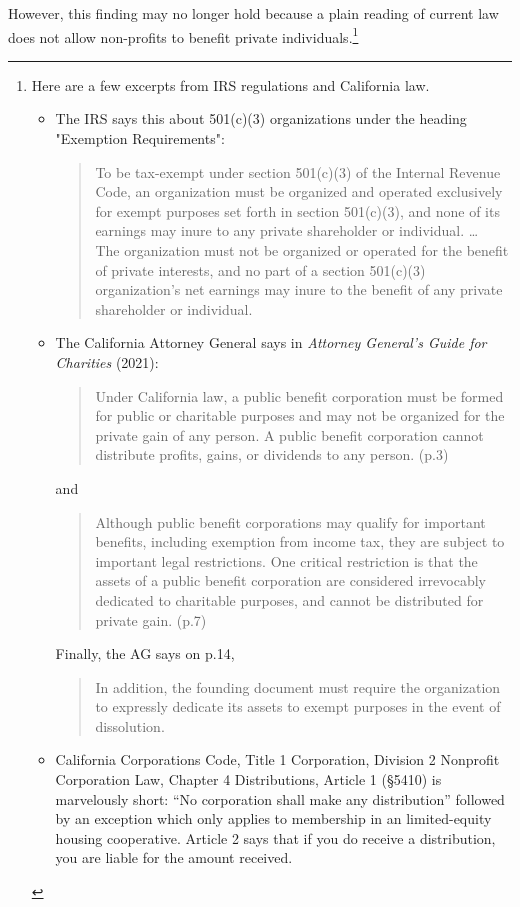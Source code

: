 However, this finding may no longer hold because a plain reading of current law does not allow non-profits to benefit private individuals.\footnote{Here are a few excerpts from IRS regulations and California law.
  
  \begin{itemize}
    \item The IRS says this about 501(c)(3) organizations under the heading "Exemption Requirements":
    \begin{quote}\noindent
      To be tax-exempt under section 501(c)(3) of the Internal Revenue Code, an organization must be organized and operated exclusively for exempt purposes set forth in section 501(c)(3), and none of its earnings may inure to any private shareholder or individual.
      \ldots\\
      The organization must not be organized or operated for the benefit of private interests, and no part of a section 501(c)(3) organization's net earnings may inure to the benefit of any private shareholder or individual.
    \end{quote}
    \item The California Attorney General says in \textit{Attorney General's Guide for Charities} (2021):
    \begin{quote}
      Under California law, a public beneﬁt corporation must be formed for public or charitable purposes and may not be organized for the private gain of any person. A public beneﬁt corporation cannot distribute proﬁts, gains, or dividends to any person. (p.3)
    \end{quote}
    and
    \begin{quote}
      Although public beneﬁt corporations may qualify for important beneﬁts, including exemption from income tax, they are subject to important legal restrictions. One critical restriction is that the assets of a public beneﬁt corporation are considered irrevocably dedicated to charitable purposes, and cannot be distributed for private gain. (p.7)
    \end{quote}
    Finally, the AG says on p.14,
    \begin{quote}
      In addition, the founding document must require the organization to expressly dedicate its assets to exempt purposes in the event of dissolution.
    \end{quote}
    \item California Corporations Code, Title 1 Corporation, Division 2 Nonprofit Corporation Law, Chapter 4 Distributions, Article 1 (§5410) is marvelously short: ``No corporation shall make any distribution'' followed by an exception which only applies to membership in an limited-equity housing cooperative. Article 2 says that if you do receive a distribution, you are liable for the amount received.
  \end{itemize}}
